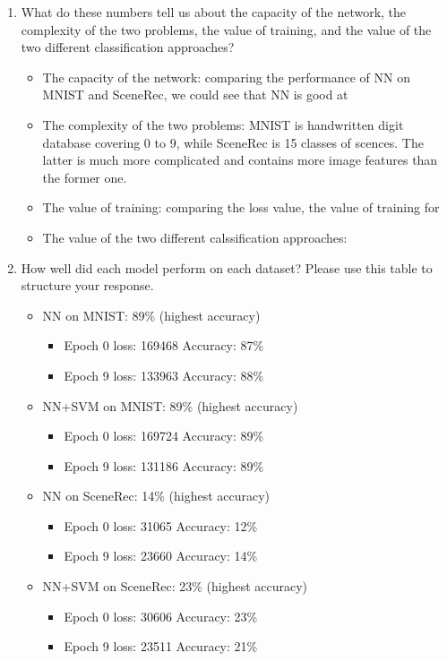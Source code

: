 \begin{enumerate}
	\item What do these numbers tell us about the capacity of the network, the complexity of the two problems, the value of training, and the value of the two different classification approaches?

	\begin{itemize}
	\item The capacity of the network: comparing the performance of NN on MNIST and SceneRec, we could see that NN is good at 
	\item The complexity of the two problems: MNIST is handwritten digit database covering 0 to 9, while SceneRec is 15 classes of scences. The latter is much more complicated and contains more image features than the former one.
	\item The value of training: comparing the loss value, the value of training for 
	\item The value of the two different calssification approaches:
	\end{itemize}

	\item How well did each model perform on each dataset? Please use this table to structure your response.

	      \begin{itemize}
		      \item NN on MNIST: 89\% (highest accuracy)
		            \begin{itemize}
			            \item Epoch 0 loss: 169468     Accuracy: 87\%
			            \item Epoch 9 loss: 133963     Accuracy: 88\%
		            \end{itemize}
		      \item NN+SVM on MNIST: 89\% (highest accuracy)
		            \begin{itemize}
			            \item Epoch 0 loss: 169724     Accuracy: 89\%
			            \item Epoch 9 loss: 131186     Accuracy: 89\%
		            \end{itemize}
		      \item NN on SceneRec: 14\% (highest accuracy)
		            \begin{itemize}
			            \item Epoch 0 loss: 31065     Accuracy: 12\%
			            \item Epoch 9 loss: 23660     Accuracy: 14\%
		            \end{itemize}
		      \item NN+SVM on SceneRec: 23\% (highest accuracy)
		            \begin{itemize}
			            \item Epoch 0 loss: 30606     Accuracy: 23\%
			            \item Epoch 9 loss: 23511     Accuracy: 21\%
		            \end{itemize}
	      \end{itemize}

\end{enumerate}


